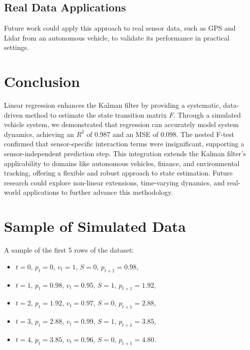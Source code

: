 \documentclass[12pt]{article}
\begin{document}
\subsection{Real Data Applications}
Future work could apply this approach to real sensor data, such as GPS and Lidar from an autonomous vehicle, to validate its performance in practical settings.

\section{Conclusion}
\label{sec:conclusion}

Linear regression enhances the Kalman filter by providing a systematic, data-driven method to estimate the state transition matrix \( F \). Through a simulated vehicle system, we demonstrated that regression can accurately model system dynamics, achieving an \( R^2 \) of 0.987 and an MSE of 0.098. The nested F-test confirmed that sensor-specific interaction terms were insignificant, supporting a sensor-independent prediction step. This integration extends the Kalman filter’s applicability to domains like autonomous vehicles, finance, and environmental tracking, offering a flexible and robust approach to state estimation. Future research could explore non-linear extensions, time-varying dynamics, and real-world applications to further advance this methodology.

\appendix

\section{Sample of Simulated Data}
\label{app:data}

A sample of the first 5 rows of the dataset:
\begin{itemize}
    \item \( t = 0 \), \( p_t = 0 \), \( v_t = 1 \), \( S = 0 \), \( p_{t+1} = 0.98 \),
    \item \( t = 1 \), \( p_t = 0.98 \), \( v_t = 0.95 \), \( S = 1 \), \( p_{t+1} = 1.92 \),
    \item \( t = 2 \), \( p_t = 1.92 \), \( v_t = 0.97 \), \( S = 0 \), \( p_{t+1} = 2.88 \),
    \item \( t = 3 \), \( p_t = 2.88 \), \( v_t = 0.99 \), \( S = 1 \), \( p_{t+1} = 3.85 \),
    \item \( t = 4 \), \( p_t = 3.85 \), \( v_t = 0.96 \), \( S = 0 \), \( p_{t+1} = 4.80 \).
\end{itemize}
\end{document}
